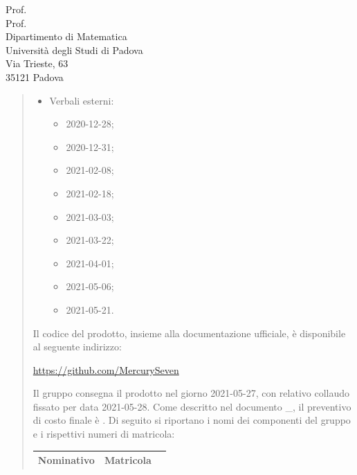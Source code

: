 \documentclass[a4paper,12pt]{letteracdp}
\begin{document}
\begin{letter}{
	Prof. \Tullio{} \\
	Prof. \Riccardo{} \\
	Dipartimento di Matematica \\
	Università degli Studi di Padova \\
	Via Trieste, 63 \\
	35121 Padova}
\begin{quotation}
\begin{itemize}
\begin{itemize}
			\item \docVI{}2021-01-28;
			\item \docVI{}2021-02-01;
			\item \docVI{}2021-03-18;
			\item \docVI{}2021-03-28;
			\item \docVI{}2021-04-15;
			\item \docVI{}2021-05-04;
			\item \docVI{}2021-05-21.
		\end{itemize}
		\item Verbali esterni:
		\begin{itemize}
			\item \docVE{}2020-12-28;
			\item \docVE{}2020-12-31;
			\item \docVE{}2021-02-08;
			\item \docVE{}2021-02-18;
			\item \docVE{}2021-03-03;
			\item \docVE{}2021-03-22;
			\item \docVE{}2021-04-01;
			\item \docVE{}2021-05-06;
			\item \docVE{}2021-05-21.
		\end{itemize}
\thispagestyle{empty}		
	\end{itemize}
Il codice del prodotto, insieme alla documentazione ufficiale, è disponibile al seguente indirizzo:\newline{}
\centerline{\url{https://github.com/MercurySeven}}\newline{}
Il gruppo consegna il prodotto nel giorno 2021-05-27, con relativo collaudo fissato per data 2021-05-28.\newline{}
Come descritto nel documento \docPdP{}\_\versPdP{}, il preventivo di costo finale è \textbf{}. \newline{}
Di seguito si riportano i nomi dei componenti del gruppo e i rispettivi numeri di matricola:
	
	
\renewcommand{\arraystretch}{1}
	\begin{table}
		\begin{center}
			\setlength{\aboverulesep}{0pt}
			\setlength{\belowrulesep}{0pt}
			\setlength{\extrarowheight}{.75ex}
			\begin{tabular}{ c c c }
				\rowcolor{AzzurroGruppo!30} 
				\textbf{Nominativo} & \textbf{Matricola}\\
				\toprule
				

\end{tabular}
\end{center}
\end{table}
\end{quotation}
\end{letter}
\end{document}
